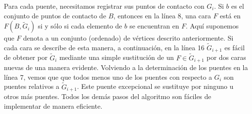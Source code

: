 \documentclass[10pt,a5paper]{book}
\begin{document}
Para cada puente, necesitamos registrar sus puntos de contacto con $G_i$. Si $b$ es el conjunto de puntos de contacto de $B$, entonces en la línea 8, una cara $F$ está en $F(B,\widetilde{G}_i)$ si y sólo si cada elemento de $b$ se encuentran en $F$. Aquí suponemos que $F$ denota a un conjunto (ordenado) de vértices descrito anteriormente. Si cada cara se describe de esta manera, a continuación, en la línea 16 $\widetilde{G}_{i+1}$ es fácil de obtener por $\widetilde{G}_i$ mediante una simple sustitución de un $F \in \widetilde{G}_{i+1}$ por dos caras nuevas de una manera evidente. Volviendo a la determinación de los puentes en la línea 7, vemos que que todos menos uno de los puentes con respecto a $G_i$ son puentes relativos a $\widetilde{G}_{i+1}$. Este puente excepcional se sustituye por ninguno u otros más puentes. Todos los demás pasos del algoritmo son fáciles de implementar de manera eficiente.
\end{document}
